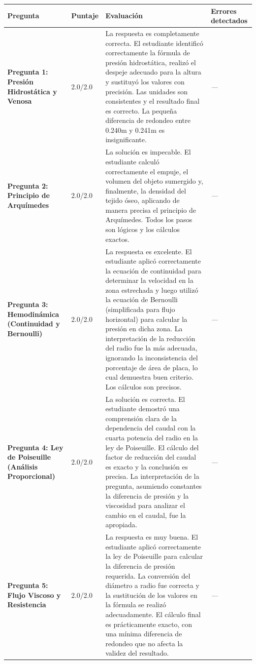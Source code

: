 \documentclass[11pt,a4paper]{article}
\begin{document}
\begin{longtable}{>{\bfseries}p{2.8cm} p{1.6cm} p{7.0cm} p{2.8cm}}
  \toprule
  \textbf{Pregunta} & \textbf{Puntaje} & \textbf{Evaluación} & \textbf{Errores detectados} \\
  \midrule
  \endhead
  \bottomrule
  \endfoot
    \textbf{Pregunta 1: Presión Hidrostática y Venosa} & 2.0/2.0 & La respuesta es completamente correcta. El estudiante identificó correctamente la fórmula de presión hidrostática, realizó el despeje adecuado para la altura y sustituyó los valores con precisión. Las unidades son consistentes y el resultado final es correcto. La pequeña diferencia de redondeo entre 0.240m y 0.241m es insignificante. & \textit{---} \\
    \midrule
    \textbf{Pregunta 2: Principio de Arquímedes} & 2.0/2.0 & La solución es impecable. El estudiante calculó correctamente el empuje, el volumen del objeto sumergido y, finalmente, la densidad del tejido óseo, aplicando de manera precisa el principio de Arquímedes. Todos los pasos son lógicos y los cálculos exactos. & \textit{---} \\
    \midrule
    \textbf{Pregunta 3: Hemodinámica (Continuidad y Bernoulli)} & 2.0/2.0 & La respuesta es excelente. El estudiante aplicó correctamente la ecuación de continuidad para determinar la velocidad en la zona estrechada y luego utilizó la ecuación de Bernoulli (simplificada para flujo horizontal) para calcular la presión en dicha zona. La interpretación de la reducción del radio fue la más adecuada, ignorando la inconsistencia del porcentaje de área de placa, lo cual demuestra buen criterio. Los cálculos son precisos. & \textit{---} \\
    \midrule
    \textbf{Pregunta 4: Ley de Poiseuille (Análisis Proporcional)} & 2.0/2.0 & La solución es correcta. El estudiante demostró una comprensión clara de la dependencia del caudal con la cuarta potencia del radio en la ley de Poiseuille. El cálculo del factor de reducción del caudal es exacto y la conclusión es precisa. La interpretación de la pregunta, asumiendo constantes la diferencia de presión y la viscosidad para analizar el cambio en el caudal, fue la apropiada. & \textit{---} \\
    \midrule
    \textbf{Pregunta 5: Flujo Viscoso y Resistencia} & 2.0/2.0 & La respuesta es muy buena. El estudiante aplicó correctamente la ley de Poiseuille para calcular la diferencia de presión requerida. La conversión del diámetro a radio fue correcta y la sustitución de los valores en la fórmula se realizó adecuadamente. El cálculo final es prácticamente exacto, con una mínima diferencia de redondeo que no afecta la validez del resultado. & \textit{---} \\
    \midrule
\end{longtable}
\end{document}
